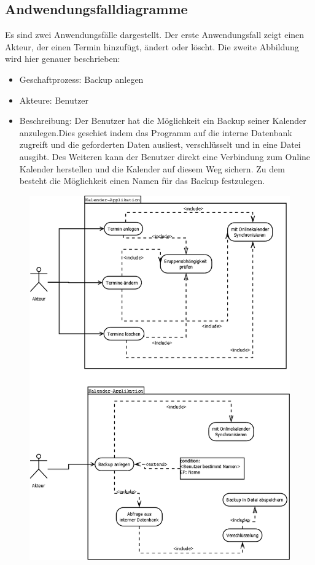 \documentclass[a4paper]{article}
\begin{document}
  	
  	\subsection{Andwendungsfalldiagramme}
  	Es sind zwei Anwendungsfälle dargestellt. Der erste Anwendungsfall zeigt einen Akteur, der einen Termin hinzufügt, ändert oder löscht. Die zweite Abbildung wird hier genauer beschrieben: 
  	    \begin{itemize}
  	    	\item Geschaftprozess:
		  	    	Backup anlegen
  	    	\item Akteure:
		  	    	Benutzer
  	    	\item Beschreibung:
		  	    	Der Benutzer hat die Möglichkeit ein Backup seiner Kalender anzulegen.Dies geschiet indem das Programm auf die interne Datenbank zugreift und die geforderten Daten ausliest, verschlüsselt und in eine Datei ausgibt. Des Weiteren kann der Benutzer direkt eine Verbindung zum Online Kalender herstellen und die Kalender auf diesem Weg sichern. Zu dem besteht die Möglichkeit einen Namen für das Backup festzulegen.
  	    \end{itemize}
  	\begin{figure}
		\centering
		\includegraphics[width=0.9\linewidth]{Anwendungsfalldiagramm.png}
		\caption{}
		\label{Anwendungsfalldiagramm}
	\end{figure}
\end{document}
